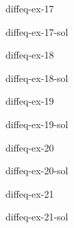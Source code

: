 \documentclass[preview]{standalone}
\begin{document}
\begin{snippetexercise}{diffeq-ex-17}{}
    \todo
\end{snippetexercise}

\begin{snippetsolution}{diffeq-ex-17-sol}{}
    \todo
\end{snippetsolution}

\begin{snippetexercise}{diffeq-ex-18}{}
    \todo
\end{snippetexercise}

\begin{snippetsolution}{diffeq-ex-18-sol}{}
    \todo
\end{snippetsolution}

\begin{snippetexercise}{diffeq-ex-19}{}
    \todo
\end{snippetexercise}

\begin{snippetsolution}{diffeq-ex-19-sol}{}
    \todo
\end{snippetsolution}

\begin{snippetexercise}{diffeq-ex-20}{}
    \todo
\end{snippetexercise}

\begin{snippetsolution}{diffeq-ex-20-sol}{}
    \todo
\end{snippetsolution}

\begin{snippetexercise}{diffeq-ex-21}{}
    \todo
\end{snippetexercise}

\begin{snippetsolution}{diffeq-ex-21-sol}{}
    \todo
\end{snippetsolution}
\end{document}
